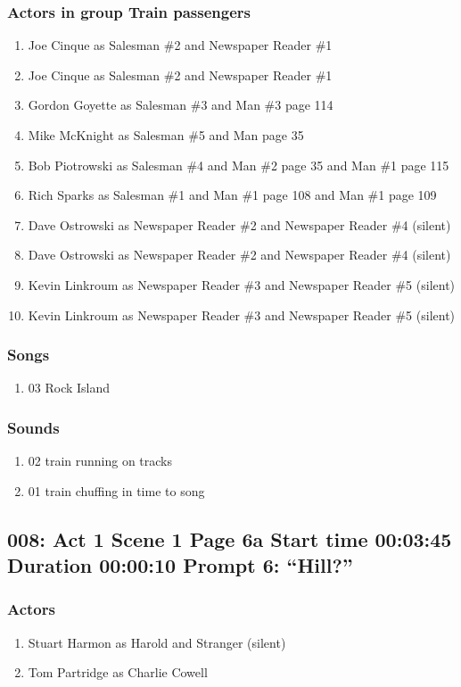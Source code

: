 \subsubsection{Actors in group Train passengers}
\begin{enumerate}
\item Joe Cinque as Salesman \#2 and Newspaper Reader \#1
\item Joe Cinque as Salesman \#2 and Newspaper Reader \#1
\item Gordon Goyette as Salesman \#3 and Man \#3 page 114
\item Mike McKnight as Salesman \#5 and Man page 35
\item Bob Piotrowski as Salesman \#4 and Man \#2 page 35 and Man \#1 page 115
\item Rich Sparks as Salesman \#1 and Man \#1 page 108 and Man \#1 page 109
\item Dave Ostrowski as Newspaper Reader \#2 and Newspaper Reader \#4 (silent)
\item Dave Ostrowski as Newspaper Reader \#2 and Newspaper Reader \#4 (silent)
\item Kevin Linkroum as Newspaper Reader \#3 and Newspaper Reader \#5 (silent)
\item Kevin Linkroum as Newspaper Reader \#3 and Newspaper Reader \#5 (silent)
\end{enumerate}

\subsubsection{Songs}
\begin{enumerate}
\item 03 Rock Island
\end{enumerate}\subsubsection{Sounds}
\begin{enumerate}
\item 02 train running on tracks
\item 01 train chuffing in time to song
\end{enumerate}
\subsection{008: Act 1 Scene 1 Page 6a Start time 00:03:45 Duration 00:00:10 Prompt 6: ``Hill?''}

\subsubsection{Actors}
\begin{enumerate}
\item Stuart Harmon as Harold and Stranger (silent)
\item Tom Partridge as Charlie Cowell
\end{enumerate}

